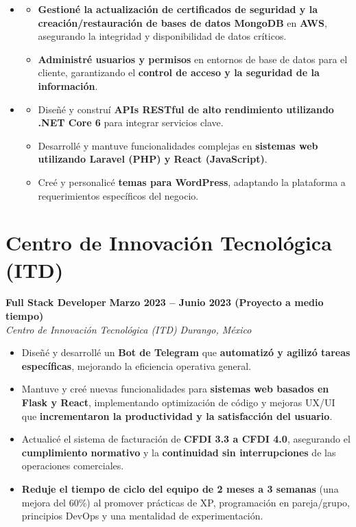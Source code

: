 \documentclass[11pt]{article}
\begin{document}
\begin{itemize}
\begin{itemize}
\begin{itemize}
        \end{itemize}
        \item \textbf{\color{reddark}{Proyecto para Dossier:}}
        \begin{itemize}
            \item \textbf{Gestioné la actualización de certificados de seguridad y la creación/restauración de bases de datos MongoDB} en \textbf{AWS}, asegurando la integridad y disponibilidad de datos críticos.
            \item \textbf{Administré usuarios y permisos} en entornos de base de datos para el cliente, garantizando el \textbf{control de acceso y la seguridad de la información}.
        \end{itemize}
        \item \textbf{\color{reddark}{Proyecto para ClubLia:}}
        \begin{itemize}
            \item Diseñé y construí \textbf{APIs RESTful de alto rendimiento utilizando .NET Core 6} para integrar servicios clave.
            \item Desarrollé y mantuve funcionalidades complejas en \textbf{sistemas web utilizando Laravel (PHP) y React (JavaScript)}.
            \item Creé y personalicé \textbf{temas para WordPress}, adaptando la plataforma a requerimientos específicos del negocio.
        \end{itemize}
    \end{itemize}
\end{itemize}

\section{Centro de Innovación Tecnológica (ITD)}

\textbf{Full Stack Developer} \hfill \textbf{Marzo 2023 – Junio 2023 (Proyecto a medio tiempo)}\\
\textit{Centro de Innovación Tecnológica (ITD)} \hfill \textit{Durango, México}\\
\begin{itemize}
    \item Diseñé y desarrollé un \textbf{Bot de Telegram} que \textbf{automatizó y agilizó tareas específicas}, mejorando la eficiencia operativa general.
    \item Mantuve y creé nuevas funcionalidades para \textbf{sistemas web basados en Flask y React}, implementando optimización de código y mejoras UX/UI que \textbf{incrementaron la productividad y la satisfacción del usuario}.
    \item Actualicé el sistema de facturación de \textbf{CFDI 3.3 a CFDI 4.0}, asegurando el \textbf{cumplimiento normativo} y la \textbf{continuidad sin interrupciones} de las operaciones comerciales.
    \item \textbf{Reduje el tiempo de ciclo del equipo de 2 meses a 3 semanas} (una mejora del 60\%) al promover prácticas de XP, programación en pareja/grupo, principios DevOps y una mentalidad de experimentación.
\end{itemize}
\end{document}
